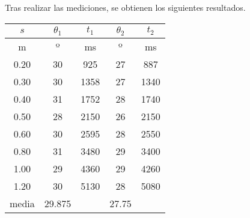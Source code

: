 \documentclass[10pt,a4paper,hidelinks]{article}
\begin{document}
\begin{multicols}{2}
\begin{center}
\begin{tikzpicture}[>=latex]
		
    
    
    
    
    
    
    
    
\end{tikzpicture}
\end{center}


Tras realizar las mediciones, se obtienen los siguientes resultados.
\begin{center}
\begin{tabular}{ c | c | c | c | c }
\hline
$s$ & $\theta_1$ & $t_1$ & $\theta_2$ & $t_2$ \\ \hline
m    &  º &   ms &  º &   ms \\ \hline \hline
0.20 & 30 &  925 & 27 &  887 \\ \hline
0.30 & 30 & 1358 & 27 & 1340 \\ \hline
0.40 & 31 & 1752 & 28 & 1740 \\ \hline
0.50 & 28 & 2150 & 26 & 2150 \\ \hline
0.60 & 30 & 2595 & 28 & 2550 \\ \hline
0.80 & 31 & 3480 & 29 & 3400 \\ \hline
1.00 & 29 & 4360 & 29 & 4260 \\ \hline
1.20 & 30 & 5130 & 28 & 5080 \\ \hline \hline
media& 29.875 &    & 27.75 & \\ \hline
\end{tabular}
\end{center}


\end{multicols}
\end{document}
